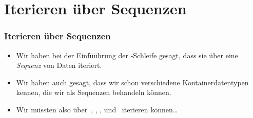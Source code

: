 \documentclass[aspectratio=169,mathserif,notheorems]{beamer}%
\begin{document}
\section{Iterieren über Sequenzen}%
%
\begin{frame}%
\frametitle{Iterieren über Sequenzen}%
\begin{itemize}%
\item Wir haben bei der Einfüührung der -Schleife gesagt, dass sie über eine \emph{Sequenz} von Daten iteriert.%
%
\item<2-> Wir haben auch gesagt, dass wir schon verschiedene Kontainerdatentypen kennen, die wir als Sequenzen behandeln können.%
%
\item<3-> Wir müssten also über~, , , und~ iterieren können\dots%
\end{itemize}%
\end{frame}%
%
\end{document}
